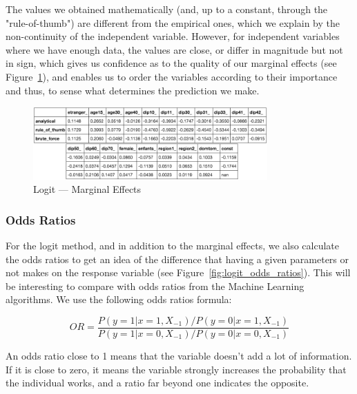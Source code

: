 The values we obtained mathematically (and, up to a constant, through the "rule-of-thumb") are different from the empirical ones, which we explain by the non-continuity of the independent variable. However, for independent variables where we have enough data, the values are close, or differ in magnitude but not in sign, which gives us confidence as to the quality of our marginal effects (see Figure~\ref{fig:logit_marginal_effects}), and enables us to order the variables according to their importance and thus, to sense what determines the prediction we make.


\begin{figure}
    \centering
    \includegraphics[width=0.8\textwidth]{img/logit_marginal_effects}
    \caption{Logit --- Marginal Effects}
    \label{fig:logit_marginal_effects}
\end{figure}

\subsubsection{Odds Ratios}
For the logit method, and in addition to the marginal effects, we also calculate the odds ratios to get an idea of the difference that having a given parameters or not makes on the response variable (see Figure~\ref{fig:logit_odds_ratios}). This will be interesting to compare with odds ratios from the Machine Learning algorithms. We use the following odds ratios formula:

\begin{equation}
    OR = \frac{P(y=1|x=1, X_{-1})/P(y=0|x=1, X_{-1})}{P(y=1|x=0, X_{-1})/P(y=0|x=0, X_{-1})}
\end{equation}

An odds ratio close to 1 means that the variable doesn’t add a lot of information. If it is close to zero, it means the variable strongly increases the probability that the individual works, and a ratio far beyond one indicates the opposite.

